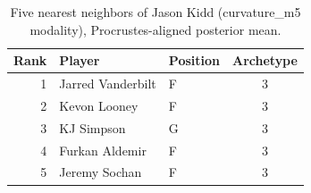 \begin{table}[htbp]
  \centering\small
  \begin{tabular}{rllc}
    \toprule
    Rank & Player & Position & Archetype \\
    \midrule
    1 & Jarred Vanderbilt & F & 3 \\
    2 & Kevon Looney & F & 3 \\
    3 & KJ Simpson & G & 3 \\
    4 & Furkan Aldemir & F & 3 \\
    5 & Jeremy Sochan & F & 3 \\
    \bottomrule
  \end{tabular}
  \caption{Five nearest neighbors of Jason Kidd (curvature_m5 modality), Procrustes-aligned posterior mean.}
  \label{tab:Jason_Kidd_neighbors_curvature_m5}
\end{table}

